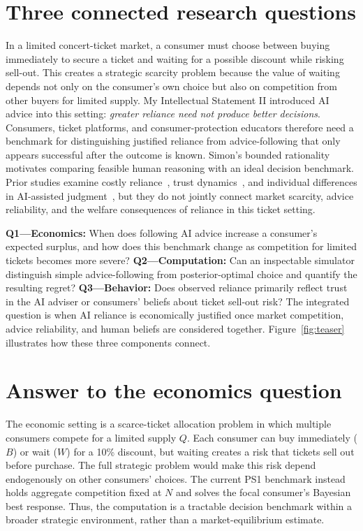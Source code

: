 \section{Three connected research questions}
In a limited concert-ticket market, a consumer must choose between buying immediately to secure a ticket and waiting for a possible discount while risking sell-out. This creates a strategic scarcity problem because the value of waiting depends not only on the consumer's own choice but also on competition from other buyers for limited supply. My Intellectual Statement II introduced AI advice into this setting: \emph{greater reliance need not produce better decisions}. Consumers, ticket platforms, and consumer-protection educators therefore need a benchmark for distinguishing justified reliance from advice-following that only appears successful after the outcome is known. Simon's bounded rationality~\cite{simon1955} motivates comparing feasible human reasoning with an ideal decision benchmark. Prior studies examine costly reliance~\cite{klingbeil2024}, trust dynamics~\cite{li2023}, and individual differences in AI-assisted judgment~\cite{pearson2026}, but they do not jointly connect market scarcity, advice reliability, and the welfare consequences of reliance in this ticket setting.

\textbf{Q1---Economics:} When does following AI advice increase a consumer's expected surplus, and how does this benchmark change as competition for limited tickets becomes more severe? \textbf{Q2---Computation:} Can an inspectable simulator distinguish simple advice-following from posterior-optimal choice and quantify the resulting regret? \textbf{Q3---Behavior:} Does observed reliance primarily reflect trust in the AI adviser or consumers' beliefs about ticket sell-out risk? The integrated question is when AI reliance is economically justified once market competition, advice reliability, and human beliefs are considered together. Figure~\ref{fig:teaser} illustrates how these three components connect.

\section{Answer to the economics question}

The economic setting is a scarce-ticket allocation problem in which multiple consumers compete for a limited supply $Q$. Each consumer can buy immediately ($B$) or wait ($W$) for a 10\% discount, but waiting creates a risk that tickets sell out before purchase. The full strategic problem would make this risk depend endogenously on other consumers' choices. The current PS1 benchmark instead holds aggregate competition fixed at $N$ and solves the focal consumer's Bayesian best response. Thus, the computation is a tractable decision benchmark within a broader strategic environment, rather than a market-equilibrium estimate.

